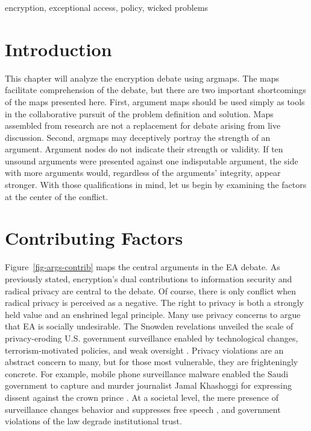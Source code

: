 \documentclass{IEEEtran}
\newcommand{\myfig}[1]{Figure~\ref{#1}}
\begin{document}
\begin{IEEEkeywords}
encryption, exceptional access, policy, wicked problems
\end{IEEEkeywords}



\section{Introduction}
\label{sec-intro}


This chapter will analyze the \ac{encryption} debate using \acp{argmap}. The maps facilitate comprehension of the
debate, but there are two important shortcomings of the maps presented here. First, argument maps should be used simply
as tools in the collaborative pursuit of the problem definition and solution. Maps assembled from research are not a
replacement for debate arising from live discussion. Second, \acp{argmap} may deceptively portray the strength of an
argument. Argument nodes do not indicate their strength or validity. If ten unsound arguments were presented against one
indisputable argument, the side with more arguments would, regardless of the arguments' integrity, appear stronger. With
those qualifications in mind, let us begin by examining the factors at the center of the conflict.


\section{Contributing Factors}
\label{sed-arg-contrib}

\myfig{fig-args-contrib} maps the central arguments in the EA debate. As previously stated, \ac{encryption}'s dual
contributions to information security and radical privacy are central to the debate. Of course, there is only conflict
when radical privacy is perceived as a negative. The right to privacy is both a strongly held value and an enshrined
legal principle. Many use privacy concerns to argue that \ac{EA} is socially undesirable. The Snowden revelations
\cite{landau_making_2013} unveiled the scale of privacy-eroding U.S. government surveillance enabled by technological
changes, terrorism-motivated policies, and weak oversight \cite{shamsi_2011}. Privacy violations are an abstract concern
to many, but for those most vulnerable, they are frighteningly concrete. For example, mobile phone surveillance malware
enabled the Saudi government to capture and murder journalist Jamal Khashoggi for expressing dissent against the crown
prince \cite{liebermann_2019}. At a societal level, the mere presence of surveillance changes behavior and suppresses
free speech \cite{rogaway_moral_2015}, and government violations of the law degrade institutional trust.
\end{document}
